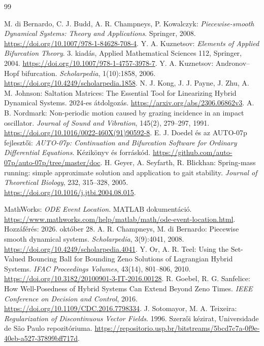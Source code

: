 \begin{thebibliography}{99}
 M. di Bernardo, C. J. Budd, A. R. Champneys, P. Kowalczyk: \emph{Piecewise-smooth Dynamical Systems: Theory and Applications}. Springer, 2008. \url{https://doi.org/10.1007/978-1-84628-708-4}.
 Y. A. Kuznetsov: \emph{Elements of Applied Bifurcation Theory}. 3. kiadás, Applied Mathematical Sciences 112, Springer, 2004. \url{https://doi.org/10.1007/978-1-4757-3978-7}.
 Y. A. Kuznetsov: Andronov--Hopf bifurcation. \emph{Scholarpedia}, 1(10):1858, 2006. \url{https://doi.org/10.4249/scholarpedia.1858}.
 N. J. Kong, J. J. Payne, J. Zhu, A. M. Johnson: Saltation Matrices: The Essential Tool for Linearizing Hybrid Dynamical Systems. 2024-es átdolgozás. \url{https://arxiv.org/abs/2306.06862v3}.
 A. B. Nordmark: Non-periodic motion caused by grazing incidence in an impact oscillator. \emph{Journal of Sound and Vibration}, 145(2), 279--297, 1991. \url{https://doi.org/10.1016/0022-460X(91)90592-8}.
 E. J. Doedel és az AUTO-07p fejlesztői: \emph{AUTO-07p: Continuation and Bifurcation Software for Ordinary Differential Equations}. Kézikönyv és forráskód. \url{https://github.com/auto-07p/auto-07p/tree/master/doc}.
 H. Geyer, A. Seyfarth, R. Blickhan: Spring-mass running: simple approximate solution and application to gait stability. \emph{Journal of Theoretical Biology}, 232, 315--328, 2005. \url{https://doi.org/10.1016/j.jtbi.2004.08.015}.

 MathWorks: \emph{ODE Event Location}. MATLAB dokumentáció. \url{https://www.mathworks.com/help/matlab/math/ode-event-location.html}. Hozzáférés: 2026. október 28.
 A. R. Champneys, M. di Bernardo: Piecewise smooth dynamical systems. \emph{Scholarpedia}, 3(9):4041, 2008. \url{https://doi.org/10.4249/scholarpedia.4041}.
 Y. Or, A. R. Teel: Using the Set-Valued Bouncing Ball for Bounding Zeno Solutions of Lagrangian Hybrid Systems. \emph{IFAC Proceedings Volumes}, 43(14), 801--806, 2010. \url{https://doi.org/10.3182/20100901-3-IT-2016.00128}.
 R. Goebel, R. G. Sanfelice: How Well-Posedness of Hybrid Systems Can Extend Beyond Zeno Times. \emph{IEEE Conference on Decision and Control}, 2016. \url{https://doi.org/10.1109/CDC.2016.7798334}.
 J. Sotomayor, M. A. Teixeira: \emph{Regularization of Discontinuous Vector Fields}. 1996. Szerzői kézirat, Universidade de São Paulo repozitóriuma. \url{https://repositorio.usp.br/bitstreams/5bcd7c7a-0f9e-40eb-a527-37899bff717d}.
\end{thebibliography}
